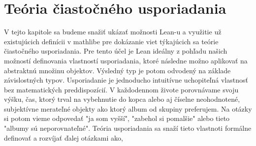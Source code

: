 \documentclass[a4paper,10pt,oneside]{report}%
\begin{document}
\chapter{Teória čiastočného usporiadania}
    V tejto kapitole sa budeme snažiť ukázať možnosti Lean-u a využitie už existujúcich
definícii v mathlibe pre dokázanie viet týkajúcich sa teórie čiastočného usporiadania.
    Pre tento účel je Lean ideálny z pohľadu našich možností definovania vlastností
usporiadania, ktoré následne možno aplikovať na abstraktnú množinu objektov.
    Výsledný typ je potom odvodený na základe závislostných typov.
    Usporiadanie je jednoducho intuitívne uchopiteľná vlastnosť bez matematických
preddispozícií.
    V každodennom živote porovnávame svoju výšku, čas, ktorý trval na vybehnutie do kopca
alebo aj číselne neohodnotené, subjektívne merateľné objekty ako ktorý album
od skupiny preferujem.
    Na otázky si potom vieme odpovedať "ja som vyšší", "zabehol si pomalšie" alebo
tieto "albumy sú neporovnateľné".
    Teória usporiadania sa snaží tieto vlastnoti formálne definovať a rozvíjať ďalej
otázkami ako,
\end{document}
